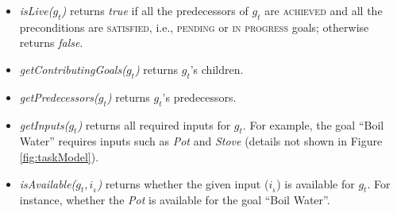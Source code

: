 \documentclass{article}
\begin{document}
\begin{itemize}[leftmargin=2pt]
  \item \textit{isLive($g_t$)} returns \textit{true} if all the predecessors of
  $g_t$ are \textsc{achieved} and all the preconditions are \textsc{satisfied},
  i.e., \textsc{pending} or \textsc{in progress} goals; otherwise returns \textit{false}.
  
  
  
  
  
  \item \textit{getContributingGoals($g_t$)} returns $g_t$'s children.
    
  \item \textit{getPredecessors($g_t$)} returns $g_t$'s predecessors.
  
  \item \textit{getInputs($g_t$)} returns all required inputs for $g_t$. For
  example, the goal ``Boil Water'' requires inputs such as \textit{Pot} and
  \textit{Stove} (details not shown in Figure \ref{fig:taskModel}).
  
  \item \textit{isAvailable($g_t, i_{_k}$)} returns whether the given input
  ($i_{_k}$) is available for $g_t$. For instance, whether the \textit{Pot} is
  available for the goal ``Boil Water''.
  
  

\end{itemize}
\end{document}
